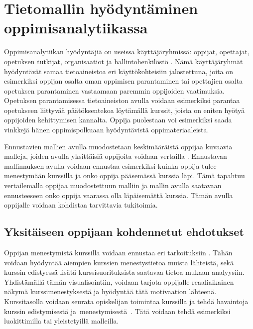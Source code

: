 
\chapter[Tietomallin hyödyntäminen oppimisanalytiikassa]{Tietomallin hyödyntäminen \\ oppimisanalytiikassa\label{luku4}}

Oppimisanalytiikan hyödyntäjiä on useissa käyttäjäryhmissä: oppijat, opettajat, opetuksen tutkijat, organisaatiot ja hallintohenkilöstö \citep{romeroEducationalDataMining2010}. Nämä käyttäjäryhmät hyödyntävät samaa tietoaineistoa eri käyttökohteisiin jalostettuna, joita on esimerkiksi oppijan osalta oman oppimisen parantaminen tai opettajien osalta opetuksen parantaminen vastaamaan paremmin oppijoiden vaatimuksia. Opetuksen parantamisessa tietoaineiston avulla voidaan esimerkiksi parantaa opetukseen liittyvää päätöksentekoa löytämällä kurssit, joista on eniten hyötyä oppijoiden kehittymisen kannalta. Oppija puolestaan voi esimerkiksi saada vinkkejä hänen oppimispolkuaan hyödyntävistä oppimateriaaleista.

Ennustavien mallien avulla muodostetaan keskimääräistä oppijaa kuvaavia malleja, joiden avulla yksittäisiä oppijoita voidaan vertailla \citep{wolffImprovingRetentionPredicting2013}. Ennustavan mallinnuksen avulla voidaan ennustaa esimerkiksi kuinka oppija tulee menestymään kurssilla ja onko oppija pääsemässä kurssia läpi. Tämä tapahtuu vertailemalla oppijaa muodostettuun malliin ja mallin avulla saatavaan ennusteeseen onko oppija vaarassa olla läpäisemättä kurssia. Tämän avulla oppijalle voidaan kohdistaa tarvittavia tukitoimia.

\section{Yksitäiseen oppijaan kohdennetut ehdotukset}

Oppijan menestymistä kurssilla voidaan ennustaa eri tarkoituksiin \citep{barberCourseCorrectionUsing2012a}. Tähän voidaan hyödyntää aiempien kurssien menestystietoa muista lähteistä, sekä kurssin edistyessä lisätä kurssisuorituksista saatavaa tietoa mukaan analyysiin. Yhdistämällä tämän visualisointiin, voidaan tarjota oppijalle reaaliaikainen näkymä kurssimenestyksestä ja hyödyntää tätä motivaation lähteenä. Kurssitasolla voidaan seurata opiskelijan toimintaa kurssilla ja tehdä havaintoja kurssin edistymisestä ja~menestymisestä~\citep{longPenetratingFogAnalytics2011,siemensLearningAnalyticsEmergence2013}. Tätä voidaan tehdä esimerkiksi luokittimilla tai yleistetyillä malleilla.

